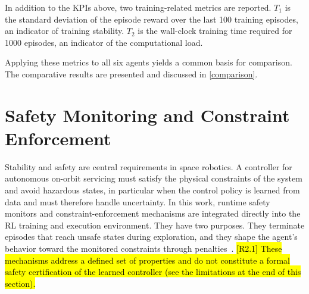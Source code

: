\documentclass{ieeeaccess}
\newcommand{\hlone}[1]{{\sethlcolor{rone}\hl{#1}}}
\begin{document}
In addition to the KPIs above, two training-related metrics are reported. $T_1$ is the
standard deviation of the episode reward over the last 100 training episodes, an indicator of training
stability. $T_2$ is the wall-clock training time required for 1000 episodes, an indicator of the
computational load.

Applying these metrics to all six agents yields a common basis for comparison. The
comparative results are presented and discussed in \cref{comparison}.

\section{Safety Monitoring and Constraint Enforcement}\label{formal}
Stability and safety are central requirements in space robotics. A controller for autonomous on-orbit
servicing must satisfy the physical constraints of the system and avoid hazardous states, in
particular when the control policy is learned from data and must therefore handle uncertainty.
In this work, runtime safety monitors and constraint-enforcement mechanisms are integrated directly into the
RL training and execution environment. They have two purposes. They terminate episodes that reach unsafe states
during exploration, and they shape the agent's behavior toward the monitored constraints through
penalties~\cite{b7,b22}. \hlone{[R2.1] These mechanisms address a defined set of properties and do not constitute a
formal safety certification of the learned controller (see the limitations at the end of this section).}
\end{document}
